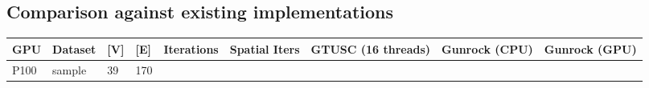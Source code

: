 \documentclass[10pt,oneside]{memoir}
\begin{document}
\hypertarget{comparison-against-existing-implementations-1}{%
\subsection{Comparison against existing
implementations}\label{comparison-against-existing-implementations-1}}

\begin{longtable}[]{@{}lllllllll@{}}
\toprule
\begin{minipage}[b]{0.04\columnwidth}\raggedright
GPU\strut
\end{minipage} & \begin{minipage}[b]{0.12\columnwidth}\raggedright
Dataset\strut
\end{minipage} & \begin{minipage}[b]{0.06\columnwidth}\raggedright
{[}V{]}\strut
\end{minipage} & \begin{minipage}[b]{0.07\columnwidth}\raggedright
{[}E{]}\strut
\end{minipage} & \begin{minipage}[b]{0.07\columnwidth}\raggedright
Iterations\strut
\end{minipage} & \begin{minipage}[b]{0.09\columnwidth}\raggedright
Spatial Iters\strut
\end{minipage} & \begin{minipage}[b]{0.12\columnwidth}\raggedright
GTUSC (16 threads)\strut
\end{minipage} & \begin{minipage}[b]{0.10\columnwidth}\raggedright
Gunrock (CPU)\strut
\end{minipage} & \begin{minipage}[b]{0.09\columnwidth}\raggedright
Gunrock (GPU)\strut
\end{minipage}\tabularnewline
\midrule
\endhead
\begin{minipage}[t]{0.04\columnwidth}\raggedright
P100\strut
\end{minipage} & \begin{minipage}[t]{0.12\columnwidth}\raggedright
sample\strut
\end{minipage} & \begin{minipage}[t]{0.06\columnwidth}\raggedright
39\strut
\end{minipage} & \begin{minipage}[t]{0.07\columnwidth}\raggedright
170\strut
\end{minipage} & \begin{minipage}[t]{0.07\columnwidth}\raggedright

\end{minipage}
\end{longtable}
\end{document}

